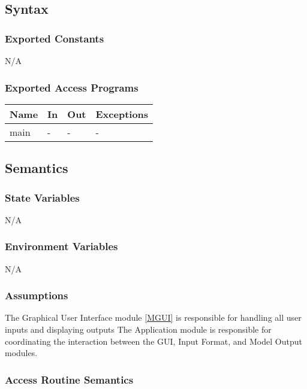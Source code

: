 \documentclass[12pt, titlepage]{article}
\begin{document}
\subsection{Syntax}

\subsubsection{Exported Constants}

N/A

\subsubsection{Exported Access Programs}

\begin{center}
\begin{tabular}{p{2cm} p{4cm} p{4cm} p{2cm}}
\hline
\textbf{Name} & \textbf{In} & \textbf{Out} & \textbf{Exceptions} \\
\hline
main & - & - & - \\
\hline
\end{tabular}
\end{center}

\subsection{Semantics}

\subsubsection{State Variables}

N/A

\subsubsection{Environment Variables}

N/A

\subsubsection{Assumptions}

The Graphical User Interface module \ref{MGUI} is responsible for handling all
user inputs and displaying outputs The Application module is responsible for
coordinating the interaction between the GUI, Input Format, and Model Output
modules.

\subsubsection{Access Routine Semantics}
\end{document}
